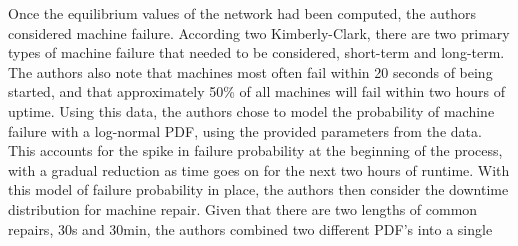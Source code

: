 \documentclass[letterpaper,10pt]{article}
\begin{document}
\begin{itemize}
Once the equilibrium values of the network had been computed, the authors considered machine failure. According two Kimberly-Clark, there are two primary types of machine failure that needed to be considered, short-term and long-term. The authors also note that machines most often fail within 20 seconds of being started, and that approximately 50\% of all machines will fail within two hours of uptime. Using this data, the authors chose to model the probability of machine failure with a log-normal PDF, using the provided parameters from the data. This accounts for the spike in failure probability at the beginning of the process, with a gradual reduction as time goes on for the next two hours of runtime. With this model of failure probability in place, the authors then consider the downtime distribution for machine repair. Given that there are two lengths of common repairs, 30s and 30min, the authors combined two different PDF's into a single 
\end{itemize}
\end{document}
